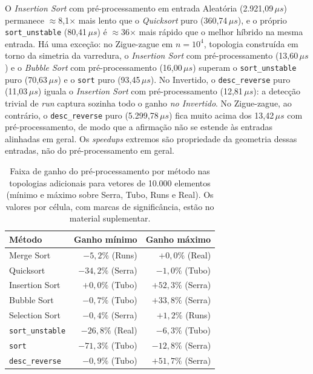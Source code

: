 \documentclass[portuguese]{sbc2025}%
\begin{document}
O \emph{Insertion Sort} com pré-processamento em entrada Aleatória (2.921{,}09\,$\mu s$) permanece $\approx$8{,}1$\times$ mais lento que o \emph{Quicksort} puro (360{,}74\,$\mu s$), e o próprio \texttt{sort\_unstable} (80{,}41\,$\mu s$) é $\approx$36$\times$ mais rápido que o melhor híbrido na mesma entrada. Há uma exceção: no Zigue-zague em $n{=}10^4$, topologia construída em torno da simetria da varredura, o \emph{Insertion Sort} com pré-processamento (13{,}60\,$\mu s$) e o \emph{Bubble Sort} com pré-processamento (16{,}00\,$\mu s$) superam o \texttt{sort\_unstable} puro (70{,}63\,$\mu s$) e o \texttt{sort} puro (93{,}45\,$\mu s$). No Invertido, o \texttt{desc\_reverse} puro (11{,}03\,$\mu s$) iguala o \emph{Insertion Sort} com pré-processamento (12{,}81\,$\mu s$): a detecção trivial de \emph{run} captura sozinha todo o ganho \emph{no Invertido}. No Zigue-zague, ao contrário, o \texttt{desc\_reverse} puro (5.299{,}78\,$\mu s$) fica muito acima dos 13{,}42\,$\mu s$ com pré-processamento, de modo que a afirmação não se estende às entradas alinhadas em geral. Os \emph{speedups} extremos são propriedade da geometria dessas entradas, não do pré-processamento em geral.

\begin{table}[htbp]
\centering
\caption{Faixa de ganho do pré-processamento por método nas topologias adicionais para vetores de 10.000 elementos (mínimo e máximo sobre Serra, Tubo, Runs e Real). Os valores por célula, com marcas de significância, estão no material suplementar.}
\label{tab:novastopologias}
\small
\begin{tabular}{lrr}
\hline
\textbf{Método} & \textbf{Ganho mínimo} & \textbf{Ganho máximo} \\
\hline
Merge Sort & $-5{,}2\%$ (Runs) & $+0{,}0\%$ (Real) \\
Quicksort & $-34{,}2\%$ (Serra) & $-1{,}0\%$ (Tubo) \\
Insertion Sort & $+0{,}0\%$ (Tubo) & $+52{,}3\%$ (Serra) \\
Bubble Sort & $-0{,}7\%$ (Tubo) & $+33{,}8\%$ (Serra) \\
Selection Sort & $-0{,}4\%$ (Serra) & $+1{,}2\%$ (Runs) \\
\texttt{sort\_unstable} & $-26{,}8\%$ (Real) & $-6{,}3\%$ (Tubo) \\
\texttt{sort} & $-71{,}3\%$ (Tubo) & $-12{,}8\%$ (Serra) \\
\texttt{desc\_reverse} & $-0{,}9\%$ (Tubo) & $+51{,}7\%$ (Serra) \\
\hline
\end{tabular}
\end{table}
\end{document}
